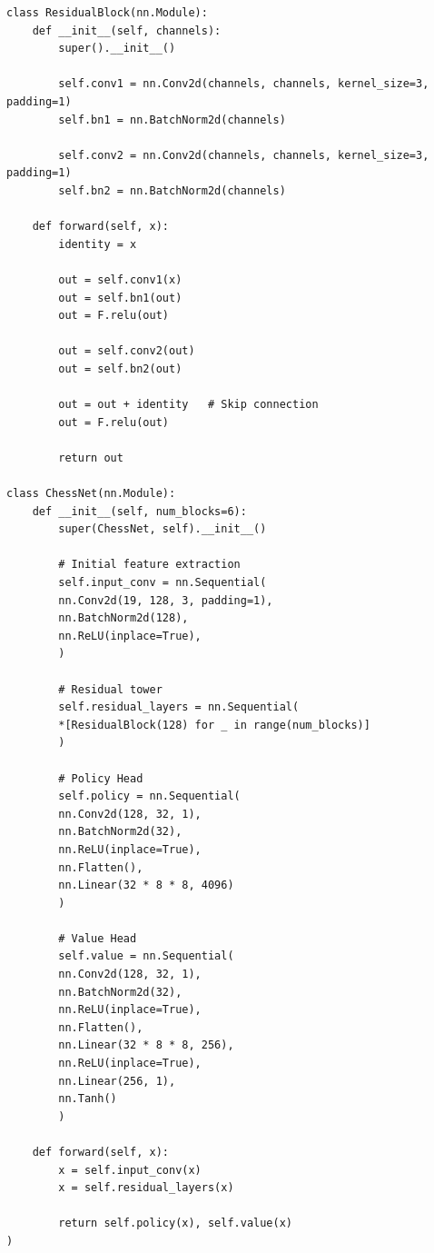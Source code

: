 \documentclass[12pt,a4paper]{article}
\begin{document}
	\begin{latin}
	\begin{verbatim}
class ResidualBlock(nn.Module):
    def __init__(self, channels):
        super().__init__()
    
        self.conv1 = nn.Conv2d(channels, channels, kernel_size=3, padding=1)
        self.bn1 = nn.BatchNorm2d(channels)
        
        self.conv2 = nn.Conv2d(channels, channels, kernel_size=3, padding=1)
        self.bn2 = nn.BatchNorm2d(channels)
    
    def forward(self, x):
        identity = x

        out = self.conv1(x)
        out = self.bn1(out)
        out = F.relu(out)
        
        out = self.conv2(out)
        out = self.bn2(out)
        
        out = out + identity   # Skip connection
        out = F.relu(out)
        
        return out

class ChessNet(nn.Module):
    def __init__(self, num_blocks=6):
        super(ChessNet, self).__init__()
        
        # Initial feature extraction
        self.input_conv = nn.Sequential(
        nn.Conv2d(19, 128, 3, padding=1),
        nn.BatchNorm2d(128),
        nn.ReLU(inplace=True),
        )
        
        # Residual tower
        self.residual_layers = nn.Sequential(
        *[ResidualBlock(128) for _ in range(num_blocks)]
        )
        
        # Policy Head
        self.policy = nn.Sequential(
        nn.Conv2d(128, 32, 1),
        nn.BatchNorm2d(32),
        nn.ReLU(inplace=True),
        nn.Flatten(),
        nn.Linear(32 * 8 * 8, 4096)
        )
        
        # Value Head
        self.value = nn.Sequential(
        nn.Conv2d(128, 32, 1),
        nn.BatchNorm2d(32),
        nn.ReLU(inplace=True),
        nn.Flatten(),
        nn.Linear(32 * 8 * 8, 256),
        nn.ReLU(inplace=True),
        nn.Linear(256, 1),
        nn.Tanh()
        )
        
    def forward(self, x):
        x = self.input_conv(x)
        x = self.residual_layers(x)
    
        return self.policy(x), self.value(x)
)
\end{verbatim}
	\end{latin}
	
\end{document}

